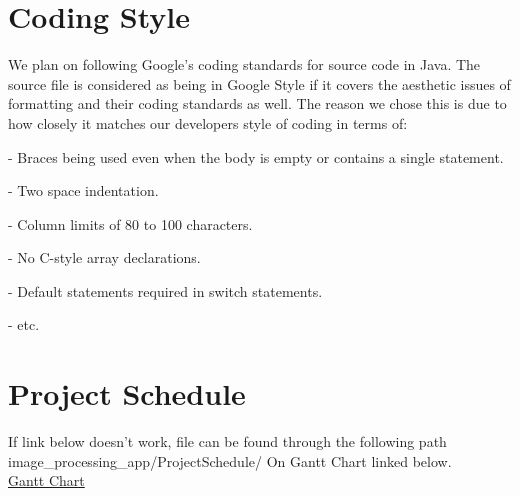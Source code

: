 \documentclass{article}
\begin{document}
\section{Coding Style}
We plan on following Google's coding standards for source code in Java. The source file is considered as being in Google Style if it covers the  aesthetic issues of formatting and their coding standards as well. The reason we chose this is due to how closely it matches our developers style of coding in terms of:

- Braces being used even when the body is empty or contains a single statement.

- Two space indentation.

- Column limits of 80 to 100 characters.

- No C-style array declarations.

- Default statements required in switch statements.

- etc.

\section{Project Schedule}
If link below doesn't work, file can be found through the following path image_processing_app/ProjectSchedule/
On Gantt Chart linked below.\\
\href{https://gitlab.cas.mcmaster.ca/dimitn/image_processing_app/blob/master/ProjectSchedule/3XA3Gantt.pdf}{Gantt Chart}
\end{document}
